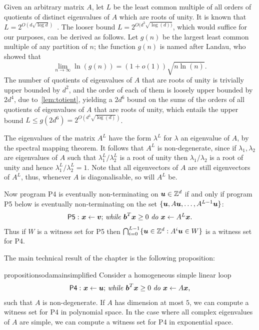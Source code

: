 Given an arbitrary matrix $A$, let $L$ be the least common multiple of
all orders of quotients of distinct eigenvalues of $A$ which are roots
of unity. It is known that $L=2^{O(d\sqrt{\log d})}$~\cite[Theorem 1.2]{BOOK}.
The looser bound $L = 2^{O(d^{3} \sqrt{\log(d))}}$, which would suffice
for our purposes, can be derived as follows.
Let $g(n)$ be the largest least common multiple of any partition of $n$;
the function $g(n)$ is named after Landau, who showed that
\[ \lim\limits_{n \rightarrow \infty} \ln(g(n)) = (1+o(1)) \sqrt{n \ln(n)} . \]
The number of quotients of eigenvalues of $A$ that are roots of unity is
trivially upper bounded by $d^{2}$, and the order of each of them is
loosely upper bounded by $2d^{4}$, due to~\cref{lem:totient}, yielding
a $2d^{6}$ bound on the sums of the orders of all quotients of eigenvalues
of $A$ that are roots of unity, which entails the upper bound
$L \leq g(2d^{6}) = 2^{O(d^{3} \sqrt{\log(d)})}$.

The eigenvalues of the matrix $A^L$ have the form $\lambda^L$ for
$\lambda$ an eigenvalue of $A$, by the spectral mapping theorem.  It follows that
$A^L$ is non-degenerate, since if $\lambda_1,\lambda_2$ are
eigenvalues of $A$ such that $\lambda^L_1/\lambda^L_2$ is a root of
unity then $\lambda_1/\lambda_2$ is a root of unity and hence
$\lambda^L_1/\lambda^L_2=1$.
Note that all eigenvectors of $A$ are still eigenvectors of $A^L$,
thus, whenever $A$ is diagonalisable, so will $A^L$ be.

Now program \textsf{P4} is eventually non-terminating on
$\boldsymbol{u}\in \mathbb{Z}^{d}$ if and only if program \textsf{P5}
below is eventually non-terminating on the set
$\lbrace \boldsymbol{u},A\boldsymbol{u}, \ldots,A^{L-1}\boldsymbol{u}\rbrace$:
\begin{gather*}
\mathsf{P5:}\ \mbox{$\boldsymbol{x}\gets \boldsymbol{v}$;
\textit{while} $\boldsymbol b^T\boldsymbol{x} \geq 0$ \textit{do} $\boldsymbol{x}\leftarrow A^L\boldsymbol{x}$.}
\end{gather*}
Thus if $W$ is a witness set for \textsf{P5} then $\bigcap_{i=0}^{L-1}
\lbrace \boldsymbol{u} \in \mathbb{Z}^{d} : A^i\boldsymbol{u} \in W\rbrace$ is a witness set for
\textsf{P4}.

The main technical result of the chapter is the following proposition:
\begin{restatable}{proposition}{sodamainsimplified}
\label{prop:soda-main-simplified}
Consider a homogeneous simple linear loop
\begin{gather*}
\mathsf{P4:}\ \mbox{$\boldsymbol{x}\gets \boldsymbol{u}$;
\textit{while} $\boldsymbol{b}^T\boldsymbol{x} \geq 0$ \textit{do} $\boldsymbol{x}\leftarrow A\boldsymbol{x}$,}
\end{gather*}
such that $A$ is non-degenerate. If $A$ has dimension at most $5$, we can compute a witness set for \textsf{P4} in polynomial space.
In the case where all complex eigenvalues of $A$ are simple, we can compute a witness set for \textsf{P4} in exponential space.
\end{restatable}

